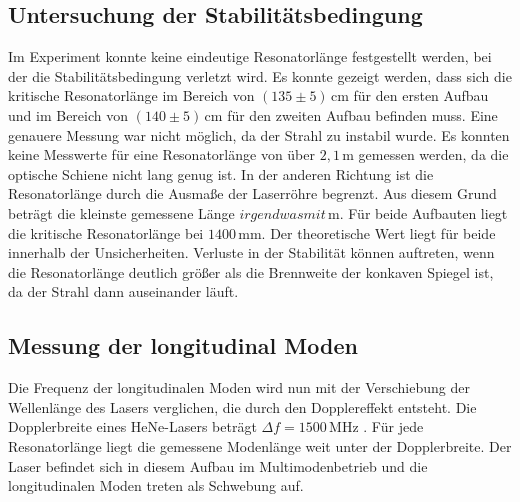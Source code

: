 \subsection{Untersuchung der Stabilitätsbedingung}
\label{sec:Stab_be}
Im Experiment konnte keine eindeutige Resonatorlänge festgestellt werden, bei der die Stabilitätsbedingung verletzt wird.
Es konnte gezeigt werden, dass sich die kritische Resonatorlänge im Bereich von $ \left( 135 \pm 5 \right) \, \unit{\centi\meter}$ für den ersten Aufbau und im Bereich von
$ \left( 140 \pm 5 \right) \, \unit{\centi\meter}$ für den zweiten Aufbau befinden muss. Eine genauere Messung war nicht möglich, da der Strahl zu instabil wurde.
Es konnten keine Messwerte für eine Resonatorlänge von über $2,1 \, \unit{\meter}$ gemessen werden, da die optische Schiene nicht lang genug ist.
In der anderen Richtung ist die Resonatorlänge durch die Ausmaße der Laserröhre begrenzt. Aus diesem Grund beträgt die kleinste gemessene Länge $irgendwas mit \, \unit{\meter}$.
Für beide Aufbauten liegt die kritische Resonatorlänge bei $1400 \, \unit{\milli\meter}$. Der theoretische Wert liegt für beide innerhalb der Unsicherheiten. 
Verluste in der Stabilität können auftreten, wenn die Resonatorlänge deutlich größer als die Brennweite der konkaven Spiegel ist, da der Strahl dann auseinander läuft.



\subsection{Messung der longitudinal Moden}
\label{sec:Stab_be}

Die Frequenz der longitudinalen Moden wird nun mit der Verschiebung der Wellenlänge des Lasers verglichen, die durch den Dopplereffekt entsteht.
Die Dopplerbreite eines HeNe-Lasers beträgt $ \Delta f = 1500 \, \unit{\mega\hertz}$ \cite{eicheich}. Für jede Resonatorlänge liegt die gemessene Modenlänge weit unter der Dopplerbreite.
Der Laser befindet sich in diesem Aufbau im Multimodenbetrieb und die longitudinalen Moden treten als Schwebung auf.
